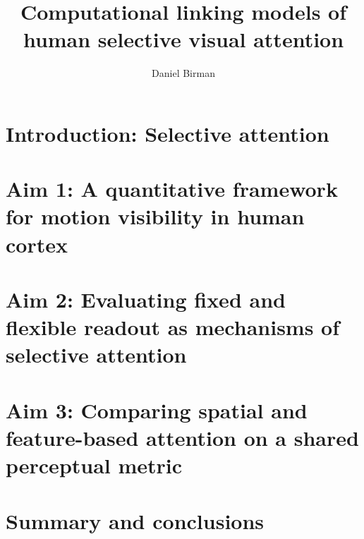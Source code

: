 \documentclass{report}
\begin{document}
\title{Computational linking models of\\human selective visual attention}
\author{Daniel Birman}

\beforepreface
{}

 


% 




\afterpreface

\chapter[Introduction]{Introduction: Selective attention}



\chapter[A framework for motion visibility]{Aim 1: A quantitative framework for motion visibility in human cortex}



\chapter[Fixed vs. flexible readout]{Aim 2: Evaluating fixed and flexible readout as mechanisms of selective attention}



\chapter[Comparing spatial and feature-based attention]{Aim 3: Comparing spatial and feature-based attention on a shared perceptual metric}



\chapter[Conclusions]{Summary and conclusions}




\newpage
{}
\printbibliography
\end{document}
